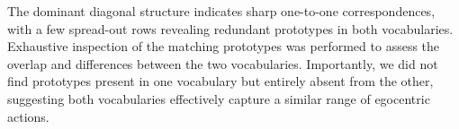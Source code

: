 \documentclass[runningheads]{llncs}
\begin{document}
The dominant diagonal structure indicates sharp one-to-one correspondences, with a few spread-out rows revealing redundant prototypes in both vocabularies. Exhaustive inspection of the matching prototypes was performed to assess the overlap and differences between the two vocabularies. Importantly, we did not find prototypes present in one vocabulary but entirely absent from the other, suggesting both vocabularies effectively capture a similar range of egocentric actions.







\end{document}
